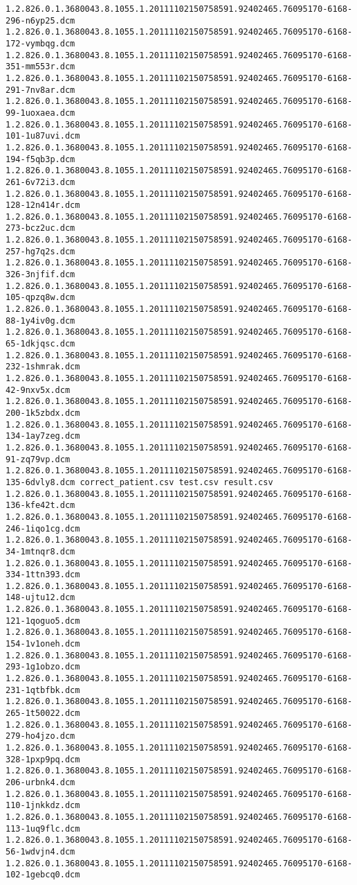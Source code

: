 \begin{lstlisting}
1.2.826.0.1.3680043.8.1055.1.20111102150758591.92402465.76095170-6168-296-n6yp25.dcm 1.2.826.0.1.3680043.8.1055.1.20111102150758591.92402465.76095170-6168-172-vymbqg.dcm 1.2.826.0.1.3680043.8.1055.1.20111102150758591.92402465.76095170-6168-351-mm553r.dcm 1.2.826.0.1.3680043.8.1055.1.20111102150758591.92402465.76095170-6168-291-7nv8ar.dcm 1.2.826.0.1.3680043.8.1055.1.20111102150758591.92402465.76095170-6168-99-1uoxaea.dcm 1.2.826.0.1.3680043.8.1055.1.20111102150758591.92402465.76095170-6168-101-1u87uvi.dcm 1.2.826.0.1.3680043.8.1055.1.20111102150758591.92402465.76095170-6168-194-f5qb3p.dcm 1.2.826.0.1.3680043.8.1055.1.20111102150758591.92402465.76095170-6168-261-6v72i3.dcm 1.2.826.0.1.3680043.8.1055.1.20111102150758591.92402465.76095170-6168-128-12n414r.dcm 1.2.826.0.1.3680043.8.1055.1.20111102150758591.92402465.76095170-6168-273-bcz2uc.dcm 1.2.826.0.1.3680043.8.1055.1.20111102150758591.92402465.76095170-6168-257-hg7q2s.dcm 1.2.826.0.1.3680043.8.1055.1.20111102150758591.92402465.76095170-6168-326-3njfif.dcm 1.2.826.0.1.3680043.8.1055.1.20111102150758591.92402465.76095170-6168-105-qpzq8w.dcm 1.2.826.0.1.3680043.8.1055.1.20111102150758591.92402465.76095170-6168-88-1y4iv0g.dcm 1.2.826.0.1.3680043.8.1055.1.20111102150758591.92402465.76095170-6168-65-1dkjqsc.dcm 1.2.826.0.1.3680043.8.1055.1.20111102150758591.92402465.76095170-6168-232-1shmrak.dcm 1.2.826.0.1.3680043.8.1055.1.20111102150758591.92402465.76095170-6168-42-9nxv5x.dcm 1.2.826.0.1.3680043.8.1055.1.20111102150758591.92402465.76095170-6168-200-1k5zbdx.dcm 1.2.826.0.1.3680043.8.1055.1.20111102150758591.92402465.76095170-6168-134-1ay7zeg.dcm 1.2.826.0.1.3680043.8.1055.1.20111102150758591.92402465.76095170-6168-91-zq79vp.dcm 1.2.826.0.1.3680043.8.1055.1.20111102150758591.92402465.76095170-6168-135-6dvly8.dcm correct_patient.csv test.csv result.csv 1.2.826.0.1.3680043.8.1055.1.20111102150758591.92402465.76095170-6168-136-kfe42t.dcm 1.2.826.0.1.3680043.8.1055.1.20111102150758591.92402465.76095170-6168-246-1iqo1cg.dcm 1.2.826.0.1.3680043.8.1055.1.20111102150758591.92402465.76095170-6168-34-1mtnqr8.dcm 1.2.826.0.1.3680043.8.1055.1.20111102150758591.92402465.76095170-6168-334-1ttn393.dcm 1.2.826.0.1.3680043.8.1055.1.20111102150758591.92402465.76095170-6168-148-ujtu12.dcm 1.2.826.0.1.3680043.8.1055.1.20111102150758591.92402465.76095170-6168-121-1qoguo5.dcm 1.2.826.0.1.3680043.8.1055.1.20111102150758591.92402465.76095170-6168-154-1v1oneh.dcm 1.2.826.0.1.3680043.8.1055.1.20111102150758591.92402465.76095170-6168-293-1g1obzo.dcm 1.2.826.0.1.3680043.8.1055.1.20111102150758591.92402465.76095170-6168-231-1qtbfbk.dcm 1.2.826.0.1.3680043.8.1055.1.20111102150758591.92402465.76095170-6168-265-1t50022.dcm 1.2.826.0.1.3680043.8.1055.1.20111102150758591.92402465.76095170-6168-279-ho4jzo.dcm 1.2.826.0.1.3680043.8.1055.1.20111102150758591.92402465.76095170-6168-328-1pxp9pq.dcm 1.2.826.0.1.3680043.8.1055.1.20111102150758591.92402465.76095170-6168-206-urbnk4.dcm 1.2.826.0.1.3680043.8.1055.1.20111102150758591.92402465.76095170-6168-110-1jnkkdz.dcm 1.2.826.0.1.3680043.8.1055.1.20111102150758591.92402465.76095170-6168-113-1uq9flc.dcm 1.2.826.0.1.3680043.8.1055.1.20111102150758591.92402465.76095170-6168-56-1wdvjn4.dcm 1.2.826.0.1.3680043.8.1055.1.20111102150758591.92402465.76095170-6168-102-1gebcq0.dcm 
\end{lstlisting}
